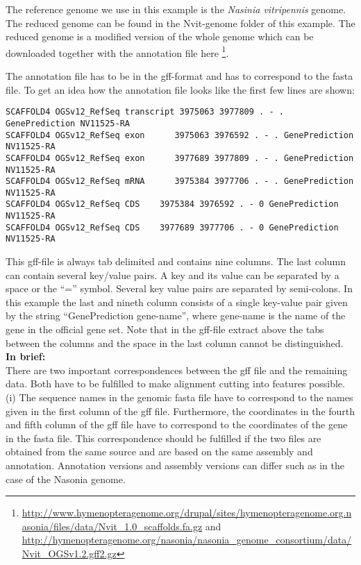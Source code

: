\documentclass[a4paper,pdflatex,11pt]{article}
\begin{document}
The reference genome we use in this example is the {\it Nasinia vitripennis} genome.  
The reduced genome can be found in the Nvit-genome folder of this example. The reduced genome
is a modified version of the whole genome which can be downloaded together with the annotation file
here
\footnote{\url{http://www.hymenopteragenome.org/drupal/sites/hymenopteragenome.org.nasonia/files/data/Nvit_1.0_scaffolds.fa.gz} and
\url{http://hymenopteragenome.org/nasonia/nasonia_genome_consortium/data/Nvit_OGSv1.2.gff2.gz}}.

The annotation file has to be in the gff-format and has to correspond to the fasta file. 
To get an idea how the annotation file looks like the first few lines are shown:

{
\small
\begin{verbatim}
SCAFFOLD4 OGSv12_RefSeq	transcript 3975063 3977809 . - . GenePrediction NV11525-RA
SCAFFOLD4 OGSv12_RefSeq	exon	  3975063 3976592 . - . GenePrediction NV11525-RA
SCAFFOLD4 OGSv12_RefSeq	exon	  3977689 3977809 . - . GenePrediction NV11525-RA
SCAFFOLD4 OGSv12_RefSeq	mRNA	  3975384 3977706 . - . GenePrediction NV11525-RA
SCAFFOLD4 OGSv12_RefSeq	CDS	   3975384 3976592 . - 0 GenePrediction NV11525-RA
SCAFFOLD4 OGSv12_RefSeq	CDS	   3977689 3977706 . - 0 GenePrediction NV11525-RA
\end{verbatim}
}

This gff-file is always tab delimited and contains nine columns. The last column can contain several key/value pairs.
A key and its value can be separated by a space or the ``='' symbol. Several key
value pairs are separated by semi-colons. In this example the last and nineth
column consists of a single key-value pair given by the string ``GenePrediction gene-name'',
where gene-name is the name of the gene in the official gene set. Note that in the gff-file extract above
the tabs between the columns and the space in the last column cannot be distinguished.\\

{\bf In brief:}\\
There are two important correspondences between the gff file and the remaining data.
Both have to be fulfilled to make alignment cutting into features possible. \\

(i) The sequence names in the genomic fasta file have to correspond to the names given
in the first column of the gff file. Furthermore, the coordinates in the fourth and fifth column
of the gff file have to correspond to the coordinates of the gene in the fasta file.
This correspondence should be fulfilled if the two files are obtained from the same source
and are based on the same assembly and annotation. Annotation versions and assembly versions can differ
such as in the case of the Nasonia genome.\\
\end{document}
